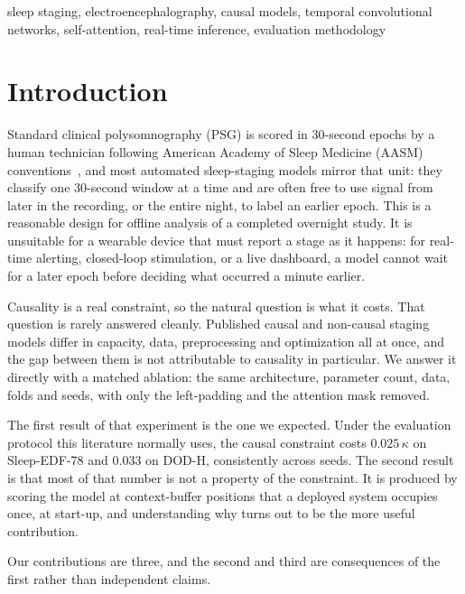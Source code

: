 \documentclass[conference]{IEEEtran}
\begin{document}
\begin{IEEEkeywords}
sleep staging, electroencephalography, causal models, temporal convolutional networks,
self-attention, real-time inference, evaluation methodology
\end{IEEEkeywords}

\section{Introduction}

Standard clinical polysomnography (PSG) is scored in 30-second epochs by a human technician
following American Academy of Sleep Medicine (AASM) conventions~\cite{aasm}, and most
automated sleep-staging models mirror that unit: they classify one 30-second window at a time
and are often free to use signal from later in the recording, or the entire night, to label an
earlier epoch. This is a reasonable design for offline analysis of a completed overnight study.
It is unsuitable for a wearable device that must report a stage as it happens: for real-time
alerting, closed-loop stimulation, or a live dashboard, a model cannot wait for a later epoch
before deciding what occurred a minute earlier.

Causality is a real constraint, so the natural question is what it costs. That question is
rarely answered cleanly. Published causal and non-causal staging models differ in capacity,
data, preprocessing and optimization all at once, and the gap between them is not attributable
to causality in particular. We answer it directly with a matched ablation: the same
architecture, parameter count, data, folds and seeds, with only the left-padding and the
attention mask removed.

The first result of that experiment is the one we expected. Under the evaluation protocol this
literature normally uses, the causal constraint costs $0.025\,\kappa$ on Sleep-EDF-78 and
$0.033$ on DOD-H, consistently across seeds. The second result is that most of that number is
not a property of the constraint. It is produced by scoring the model at context-buffer
positions that a deployed system occupies once, at start-up, and understanding why turns out
to be the more useful contribution.

Our contributions are three, and the second and third are consequences of the first rather
than independent claims.
\end{document}
